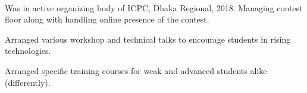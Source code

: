  \\

\vspace{\topsep} %
\begin{tightitemize}
\item Was in active organizing body of ICPC, Dhaka Regional, 2018. Managing contest floor along with handling online presence of the contest. 
\item Arranged various workshop and technical talks to encourage students in rising technologies.
\item Arranged specific training courses for weak and advanced students alike (differently). 
\end{tightitemize}

\sectionspace %
